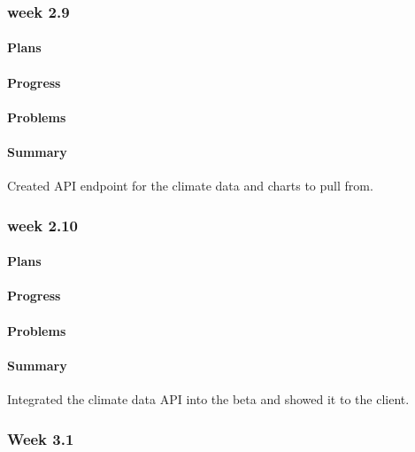 \documentclass[onecolumn, draftclsnofoot,10pt, compsoc]{article}
\begin{document}
		\subsubsection{week 2.9}
			\paragraph{Plans} \hfill \break

			\paragraph{Progress} \hfill \break

			\paragraph{Problems} \hfill \break

			\paragraph{Summary} \hfill \break
                Created API endpoint for the climate data and charts to pull from.

		\subsubsection{week 2.10}
			\paragraph{Plans} \hfill \break

			\paragraph{Progress} \hfill \break

			\paragraph{Problems} \hfill \break

			\paragraph{Summary} \hfill \break
			    Integrated the climate data API into the beta and showed it to the client.

		\subsubsection{Week 3.1}
\end{document}
